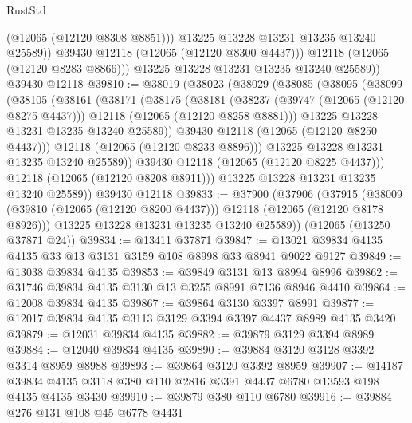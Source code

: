 \begin{lexlean}{RustStd}
\begin{coremodule}
                  (@12065 (@12120 @8308 @8851)))
                @13225
                @13228
                @13231
                @13235
                @13240
                @25589))
            @39430
            @12118
            (@12065 (@12120 @8300 @4437)))
          @12118
          (@12065 (@12120 @8283 @8866)))
        @13225
        @13228
        @13231
        @13235
        @13240
        @25589))
    @39430
    @12118
@39810 := @38019
    (@38023
      (@38029
        (@38085
          (@38095
            (@38099
              (@38105
                (@38161
                  (@38171
                    (@38175
                      (@38181
                        (@38237
                          (@39747 (@12065 (@12120 @8275 @4437)))
                          @12118
                          (@12065 (@12120 @8258 @8881)))
                        @13225
                        @13228
                        @13231
                        @13235
                        @13240
                        @25589))
                    @39430
                    @12118
                    (@12065 (@12120 @8250 @4437)))
                  @12118
                  (@12065 (@12120 @8233 @8896)))
                @13225
                @13228
                @13231
                @13235
                @13240
                @25589))
            @39430
            @12118
            (@12065 (@12120 @8225 @4437)))
          @12118
          (@12065 (@12120 @8208 @8911)))
        @13225
        @13228
        @13231
        @13235
        @13240
        @25589))
    @39430
    @12118
@39833 := @37900
    (@37906
      (@37915
        (@38009 (@39810 (@12065 (@12120 @8200 @4437))) @12118 (@12065 (@12120 @8178 @8926)))
        @13225
        @13228
        @13231
        @13235
        @13240
        @25589))
    (@12065 (@13250 @37871 @24))
@39834 := @13411 @37871
@39847 := @13021 @39834 @4135 @4135 @33 @13 @3131 @3159 @108 @8998 @33 @8941 @9022 @9127
@39849 := @13038 @39834 @4135
@39853 := @39849 @3131 @13 @8994 @8996
@39862 := @31746 @39834 @4135 @3130 @13 @3255 @8991 @7136 @8946 @4410
@39864 := @12008 @39834 @4135
@39867 := @39864 @3130 @3397 @8991
@39877 := @12017 @39834 @4135 @3113 @3129 @3394 @3397 @4437 @8989 @4135 @3420
@39879 := @12031 @39834 @4135
@39882 := @39879 @3129 @3394 @8989
@39884 := @12040 @39834 @4135
@39890 := @39884 @3120 @3128 @3392 @3314 @8959 @8988
@39893 := @39864 @3120 @3392 @8959
@39907 := @14187 @39834 @4135 @3118 @380 @110 @2816 @3391 @4437 @6780 @13593 @198 @4135 @4135 @3430
@39910 := @39879 @380 @110 @6780
@39916 := @39884 @276 @131 @108 @45 @6778 @4431

\end{coremodule}
\end{lexlean}
